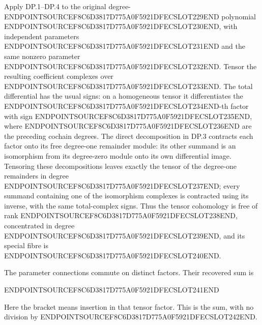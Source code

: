 Apply DP.1--DP.4 to the original degree-ENDPOINTSOURCEF8C6D3817D775A0F5921DFECSLOT229END polynomial ENDPOINTSOURCEF8C6D3817D775A0F5921DFECSLOT230END, with independent parameters ENDPOINTSOURCEF8C6D3817D775A0F5921DFECSLOT231END and the same nonzero parameter ENDPOINTSOURCEF8C6D3817D775A0F5921DFECSLOT232END. Tensor the resulting coefficient complexes over ENDPOINTSOURCEF8C6D3817D775A0F5921DFECSLOT233END. The total differential has the usual signs: on a homogeneous tensor it differentiates the ENDPOINTSOURCEF8C6D3817D775A0F5921DFECSLOT234END-th factor with sign ENDPOINTSOURCEF8C6D3817D775A0F5921DFECSLOT235END, where ENDPOINTSOURCEF8C6D3817D775A0F5921DFECSLOT236END are the preceding cochain degrees. The direct decomposition in DP.3 contracts each factor onto its free degree-one remainder module: its other summand is an isomorphism from its degree-zero module onto its own differential image. Tensoring these decompositions leaves exactly the tensor of the degree-one remainders in degree ENDPOINTSOURCEF8C6D3817D775A0F5921DFECSLOT237END; every summand containing one of the isomorphism complexes is contracted using its inverse, with the same total-complex signs. Thus the tensor cohomology is free of rank ENDPOINTSOURCEF8C6D3817D775A0F5921DFECSLOT238END, concentrated in degree ENDPOINTSOURCEF8C6D3817D775A0F5921DFECSLOT239END, and its special fibre is ENDPOINTSOURCEF8C6D3817D775A0F5921DFECSLOT240END.

The parameter connections commute on distinct factors. Their recovered sum is

ENDPOINTSOURCEF8C6D3817D775A0F5921DFECSLOT241END

Here the bracket means insertion in that tensor factor. This is the sum, with no division by ENDPOINTSOURCEF8C6D3817D775A0F5921DFECSLOT242END.

